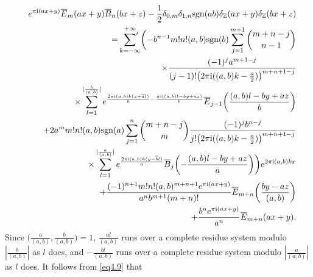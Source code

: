 \documentclass[reqno]{amsart}
\numberwithin{equation}{section}
\begin{document}
\begin{eqnarray}\label{eq4.9}
&&e^{\pi\mathrm{i}(ax+y)}\overline{E}_{m}(ax+y)\overline{B}_{n}(bx+z)-\frac{1}{2}\delta_{0,m}\delta_{1,n}\mathrm{sgn}(ab)\delta_{\mathbb{Z}}(ax+y)\delta_{\mathbb{Z}}(bx+z)\nonumber\\
&&=\sideset{}{'}\sum_{k=-\infty}^{+\infty}\biggl(-b^{n-1}m!n!(a,b)\mathrm{sgn}(b)\sum_{j=1}^{m+1}
\binom{m+n-j}{n-1}\nonumber\\
&&\qquad\times\frac{(-1)^{j}a^{m+1-j}}{(j-1)!\bigl(2\pi\mathrm{i}((a,b)k-\frac{a}{2})\bigl)^{m+n+1-j}}\nonumber\\
&&\qquad\times\sum_{l=1}^{|\frac{b}{(a,b)}|}e^{\frac{2\pi\mathrm{i}(a,b)k(z+\overline{a}l)}{b}-\frac{\pi\mathrm{i}((a,b)l-by+az)}{b}}
\overline{E}_{j-1}\biggl(\frac{(a,b)l-by+az}{b}\biggl)\nonumber\\
&&\quad+2a^{m}m!n!(a,b)\mathrm{sgn}(a)\sum_{j=1}^{n}\binom{m+n-j}{m}\frac{(-1)^{j}b^{n-j}}{j!\bigl(2\pi\mathrm{i}((a,b)k-\frac{a}{2})\bigl)^{m+n+1-j}}\nonumber\\
&&\qquad\times\sum_{l=1}^{|\frac{a}{(a,b)}|}e^{\frac{2\pi\mathrm{i}(a,b)k(y-\overline{b}l)}{a}}
\overline{B}_{j}\biggl(-\frac{(a,b)l-by+az}{a}\biggl)\biggl)e^{2\pi\mathrm{i}(a,b)kx}\nonumber\\
&&\quad+\frac{(-1)^{n+1}m!n!(a,b)^{m+n+1}e^{\pi\mathrm{i}(ax+y)}}{a^{n}b^{m+1}(m+n)!}\overline{E}_{m+n}\biggl(\frac{by-az}{(a,b)}\biggl)\nonumber\\
&&\quad+\frac{b^{n}e^{\pi\mathrm{i}(ax+y)}}{a^{n}}\overline{E}_{m+n}(ax+y).
\end{eqnarray}
Since $\bigl(\frac{a}{(a,b)},\frac{b}{(a,b)}\bigl)=1$, $\frac{al}{(a,b)}$ runs over a complete residue
system modulo $|\frac{b}{(a,b)}|$ as $l$ does, and $-\frac{bl}{(a,b)}$ runs over a complete residue system modulo $|\frac{a}{(a,b)}|$
as $l$ does. It follows from \eqref{eq4.9} that
\end{document}
